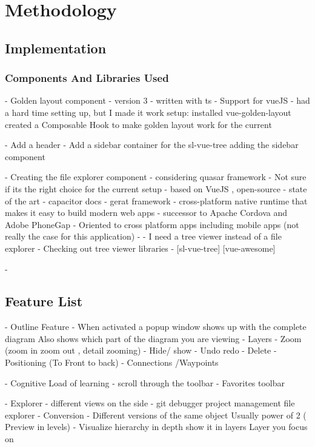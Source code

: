 \chapter{Methodology}

\section{Implementation}


\subsection{Components And Libraries Used}

- Golden layout component
- version 3 - written with ts
- Support for vueJS
- had a hard time setting up, but I made it work
setup: 
installed vue-golden-layout
created a Composable Hook to make golden layout work for the current 

- Add a header 
- Add a sidebar container for the sl-vue-tree
adding the sidebar component 


- Creating the file explorer component
- considering quasar framework
- Not sure if its the right choice for the current setup
- based on VueJS , open-source
- state of the art 
- capacitor docs 
- gerat framework 
- cross-platform native runtime that makes it easy to build modern web apps
- successor to Apache Cordova and Adobe PhoneGap
- Oriented to cross platform apps including mobile apps (not really the case for this application)
- 
- I need a tree viewer instead of a file explorer - Checking out tree viewer
libraries 
- [sl-vue-tree] [vue-awesome] 





-\section{Feature List}
- Outline Feature - When activated a popup window shows up with the complete diagram Also shows which part of the diagram you are viewing
- Layers 
- Zoom (zoom in zoom out , detail zooming) 
- Hide/ show 
- Undo redo 
- Delete 
- Positioning (To Front to back) 
- Connections /Waypoints 

- Cognitive Load of learning 
- scroll through the toolbar 
- Favorites toolbar 

- Explorer 
 	- different views on the side 
 	- git debugger project management file explorer 
- Conversion 
- Different versions of the same object Usually power of 2 ( Preview in levels) 
- Visualize hierarchy in depth show it in layers Layer you focus on 
 
